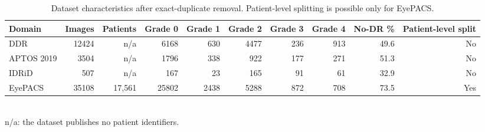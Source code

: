 \begin{table}[t]
\centering
\caption{Dataset characteristics after exact-duplicate removal. Patient-level splitting is possible only for EyePACS.}
\label{tab:datasets}
\begin{tabular}{lrrrrrrrrr}
\toprule
Domain & Images & Patients & Grade 0 & Grade 1 & Grade 2 & Grade 3 & Grade 4 & No-DR \% & Patient-level split \\
\midrule
DDR & 12424 & n/a & 6168 & 630 & 4477 & 236 & 913 & 49.6 & No \\
APTOS 2019 & 3504 & n/a & 1796 & 338 & 922 & 177 & 271 & 51.3 & No \\
IDRiD & 507 & n/a & 167 & 23 & 165 & 91 & 61 & 32.9 & No \\
EyePACS & 35108 & 17,561 & 25802 & 2438 & 5288 & 872 & 708 & 73.5 & Yes \\
\bottomrule
\end{tabular}
\vspace{2pt}\\\footnotesize{n/a: the dataset publishes no patient identifiers.}
\end{table}